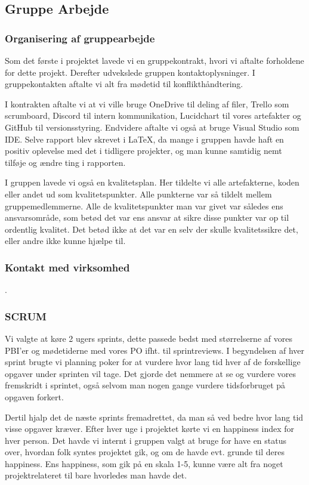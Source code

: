 \subsection{Gruppe Arbejde}
\subsubsection{Organisering af gruppearbejde}

Som det første i projektet lavede vi en gruppekontrakt, 
hvori vi aftalte forholdene for dette projekt. Derefter udvekslede gruppen kontaktoplysninger.
I gruppekontakten aftalte vi alt fra mødetid til konflikthåndtering.


I kontrakten aftalte vi at vi ville bruge OneDrive til deling af filer, Trello som scrumboard, Discord til intern kommunikation, Lucidchart til vores artefakter og GitHub til versionsstyring. 
Endvidere aftalte vi også
at bruge Visual Studio som IDE.
Selve rapport blev skrevet i \LaTeX, da mange i gruppen havde haft en positiv oplevelse med det i tidligere projekter, og man kunne samtidig nemt tilføje og ændre ting i rapporten.

I gruppen lavede vi også en kvalitetsplan. Her tildelte vi alle artefakterne, koden eller andet ud som kvalitetspunkter. 
Alle punkterne var så tildelt mellem gruppemedlemmerne. Alle de kvalitetspunkter man var givet var således ens ansvarsområde, som betød det var ens ansvar at sikre disse punkter var op til ordentlig kvalitet. 
Det betød ikke at det var en selv der skulle kvalitetssikre det, eller andre ikke kunne hjælpe til.

\subsubsection{Kontakt med virksomhed}
.

\subsubsection{SCRUM}

Vi valgte at køre 2 ugers sprints, dette passede bedst med størrelserne af vores PBI'er og mødetiderne med vores PO ifht. til sprintreviews.
I begyndelsen af hver sprint brugte vi planning poker for at vurdere hvor lang tid hver af de forskellige opgaver under sprinten vil tage.
Det gjorde det nemmere at se og vurdere vores fremskridt i sprintet, også selvom man nogen gange vurdere tidsforbruget på opgaven forkert.

Dertil hjalp det de næste sprints fremadrettet, da man så ved bedre hvor lang tid visse opgaver kræver.
Efter hver uge i projektet kørte vi en happiness index for hver person.
Det havde vi internt i gruppen valgt
at bruge for have en status over, hvordan folk syntes projektet gik, og om de havde evt. grunde til deres happiness.
Ens happiness, som gik på en skala 1-5, kunne være alt fra noget projektrelateret til bare hvorledes man havde det.

